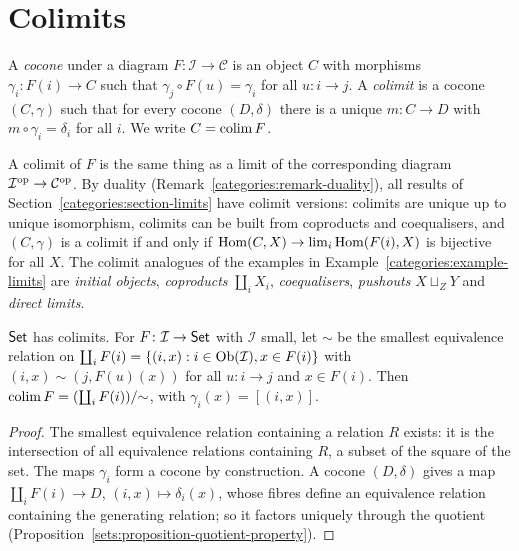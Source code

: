 \section{Colimits}\label{categories:section-colimits}

\begin{definition}\label{categories:definition-colimit}
A \emph{cocone} under a diagram $F \colon \mathcal{I} \to \mathcal{C}$ is an object $C$
with morphisms $\gamma_i \colon F(i) \to C$ such that $\gamma_j \circ F(u) = \gamma_i$ for
all $u \colon i \to j$. A \emph{colimit} is a cocone $(C, \gamma)$ such that for every
cocone $(D, \delta)$ there is a unique $m \colon C \to D$ with $m \circ \gamma_i = \delta_i$
for all $i$. We write $C = \operatorname*{colim} F$.
\end{definition}

\begin{remark}\label{categories:remark-colimits-dual}
A colimit of $F$ is the same thing as a limit of the corresponding diagram
$\mathcal{I}^{\mathrm{op}} \to \mathcal{C}^{\mathrm{op}}$. By duality
(Remark~\ref{categories:remark-duality}), all results of
Section~\ref{categories:section-limits} have colimit versions: colimits are
unique up to unique isomorphism, colimits can be built from coproducts and
coequalisers, and $(C, \gamma)$ is a colimit if and only if
$\operatorname{Hom}(C, X) \to \lim_i \operatorname{Hom}(F(i), X)$ is bijective for all $X$. The colimit
analogues of the examples in Example~\ref{categories:example-limits} are
\emph{initial objects}, \emph{coproducts} $\coprod_i X_i$, \emph{coequalisers},
\emph{pushouts} $X \sqcup_Z Y$ and \emph{direct limits}.
\end{remark}

\begin{proposition}\label{categories:proposition-colimits-sets}
$\mathsf{Set}$ has colimits. For $F \colon \mathcal{I} \to \mathsf{Set}$ with $\mathcal{I}$ small, let
$\sim$ be the smallest equivalence relation on
$\coprod_i F(i) = \{(i, x) : i \in \operatorname{Ob}(\mathcal{I}), x \in F(i)\}$ with
$(i, x) \sim (j, F(u)(x))$ for all $u \colon i \to j$ and $x \in F(i)$. Then
$\operatorname*{colim} F = (\coprod_i F(i))/{\sim}$, with $\gamma_i(x) = [(i, x)]$.
\end{proposition}

\begin{proof}
The smallest equivalence relation containing a relation $R$ exists: it is the
intersection of all equivalence relations containing $R$, a subset of the
square of the set. The maps $\gamma_i$ form a cocone by construction. A cocone
$(D, \delta)$ gives a map $\coprod_i F(i) \to D$, $(i, x) \mapsto \delta_i(x)$, whose
fibres define an equivalence relation containing the generating relation; so
it factors uniquely through the quotient
(Proposition~\ref{sets:proposition-quotient-property}).
\end{proof}


